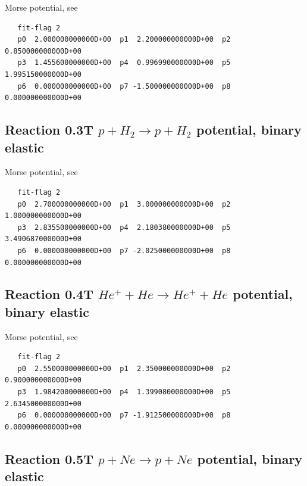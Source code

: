 \documentclass[12pt,dvips]{article}
\begin{document}
Morse potential, see \cite{kn:Bachmann}

\begin{small}\begin{verbatim}
   fit-flag 2
   p0  2.000000000000D+00  p1  2.200000000000D+00  p2  0.850000000000D+00
   p3  1.455600000000D+00  p4  0.996990000000D+00  p5  1.995150000000D+00
   p6  0.000000000000D+00  p7 -1.500000000000D+00  p8  0.000000000000D+00
\end{verbatim}\end{small}


\newpage

\subsection{
Reaction 0.3T    $p + H_2 \rightarrow p + H_2 $ potential, binary elastic
}

Morse potential, see \cite{kn:Bachmann}
\begin{small}\begin{verbatim}
   fit-flag 2
   p0  2.700000000000D+00  p1  3.000000000000D+00  p2  1.000000000000D+00
   p3  2.835500000000D+00  p4  2.180380000000D+00  p5  3.490687000000D+00
   p6  0.000000000000D+00  p7 -2.025000000000D+00  p8  0.000000000000D+00
\end{verbatim}\end{small}


\newpage

\subsection{
Reaction 0.4T   $  He^+ + He \rightarrow He^+ + He $ potential, binary elastic
}

Morse potential, see \cite{kn:Bachmann}
\begin{small}\begin{verbatim}
   fit-flag 2
   p0  2.550000000000D+00  p1  2.350000000000D+00  p2  0.900000000000D+00
   p3  1.984200000000D+00  p4  1.399080000000D+00  p5  2.634500000000D+00
   p6  0.000000000000D+00  p7 -1.912500000000D+00  p8  0.000000000000D+00
\end{verbatim}\end{small}


\newpage

\subsection{
Reaction 0.5T   $ p + Ne \rightarrow p + Ne $ potential, binary elastic
}
\end{document}
